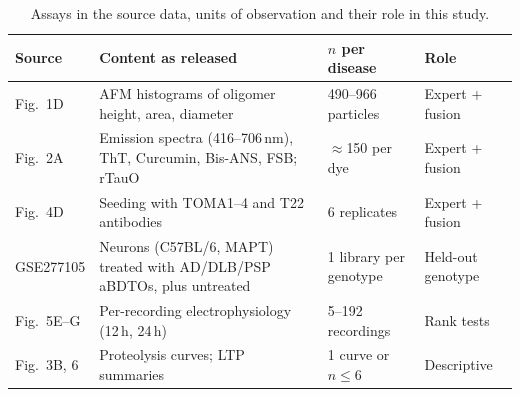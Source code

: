 \begin{table}[!htbp]
\centering\scriptsize
\caption{Assays in the source data, units of observation and their role in this study.}\label{tab:s_assays}
\begin{tabular}{p{1.6cm}p{6.2cm}p{2.4cm}p{2.4cm}}
\toprule
\textbf{Source} & \textbf{Content as released} & \textbf{$n$ per disease} & \textbf{Role} \\
\midrule
Fig.~1D & AFM histograms of oligomer height, area, diameter & 490--966 particles & Expert + fusion \\
Fig.~2A & Emission spectra (416--706\,nm), ThT, Curcumin, Bis-ANS, FSB; rTauO & $\approx$150 per dye & Expert + fusion \\
Fig.~4D & Seeding with TOMA1--4 and T22 antibodies & 6 replicates & Expert + fusion \\
GSE277105 & Neurons (C57BL/6, MAPT) treated with AD/DLB/PSP aBDTOs, plus untreated & 1 library per genotype & Held-out genotype \\
Fig.~5E--G & Per-recording electrophysiology (12\,h, 24\,h) & 5--192 recordings & Rank tests \\
Fig.~3B, 6 & Proteolysis curves; LTP summaries & 1 curve or $n\le6$ & Descriptive \\
\bottomrule
\end{tabular}
\end{table}

